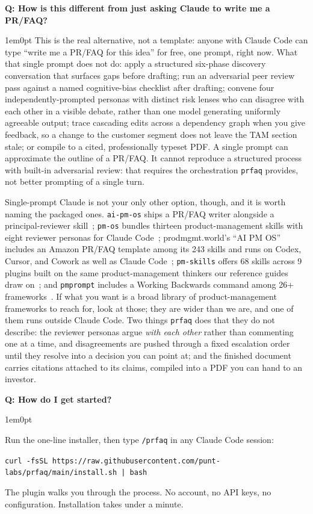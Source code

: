 \documentclass[11pt,letterpaper]{article}
\newcounter{faqnum}
\newenvironment{faqpair}[1]{%
  \needspace{4\baselineskip}%
  \vspace{0.5em}%
  \refstepcounter{faqnum}%
  \noindent\textbf{\color{SectionBlue}Q\thefaqnum: #1}\par\nopagebreak[4]%
  \vspace{0.2em}%
  \begin{adjustwidth}{1em}{0pt}%
  \setlength{\parindent}{0pt}%
}{%
  \end{adjustwidth}%
  \vspace{0.5em}%
}
\begin{document}
\begin{faqpair}{How is this different from just asking Claude to write me a PR/FAQ?}\label{faq:vs-single-prompt}
  This is the real alternative, not a template: anyone with Claude Code can type ``write me a PR/FAQ for this idea'' for free, one prompt, right now. What that single prompt does not do: apply a structured six-phase discovery conversation that surfaces gaps before drafting; run an adversarial peer review pass against a named cognitive-bias checklist after drafting; convene four independently-prompted personas with distinct risk lenses who can disagree with each other in a visible debate, rather than one model generating uniformly agreeable output; trace cascading edits across a dependency graph when you give feedback, so a change to the customer segment does not leave the TAM section stale; or compile to a cited, professionally typeset PDF. A single prompt can approximate the outline of a PR/FAQ. It cannot reproduce a structured process with built-in adversarial review: that requires the orchestration \texttt{prfaq} provides, not better prompting of a single turn.

  Single-prompt Claude is not your only other option, though, and it is worth naming the packaged ones. \texttt{ai-pm-os} ships a PR/FAQ writer alongside a principal-reviewer skill~\cite{aipmos2026}; \texttt{pm-os} bundles thirteen product-management skills with eight reviewer personas for Claude Code~\cite{sevanpro2026pmos}; prodmgmt.world's ``AI PM OS'' includes an Amazon PR/FAQ template among its 243 skills and runs on Codex, Cursor, and Cowork as well as Claude Code~\cite{prodmgmtworld2026aipmos}; \texttt{pm-skills} offers 68 skills across 9 plugins built on the same product-management thinkers our reference guides draw on~\cite{pmskills2026}; and \texttt{pmprompt} includes a Working Backwards command among 26+ frameworks~\cite{pmprompt2026}. If what you want is a broad library of product-management frameworks to reach for, look at those; they are wider than we are, and one of them runs outside Claude Code. Two things \texttt{prfaq} does that they do not describe: the reviewer personas argue \textit{with each other} rather than commenting one at a time, and disagreements are pushed through a fixed escalation order until they resolve into a decision you can point at; and the finished document carries citations attached to its claims, compiled into a PDF you can hand to an investor.
\end{faqpair}

\begin{faqpair}{How do I get started?}
  Run the one-line installer, then type \texttt{/prfaq} in any Claude Code session:

  \smallskip
  {\small\texttt{curl -fsSL https://raw.githubusercontent.com/punt-labs/prfaq/main/install.sh | bash}}
  \smallskip

  \noindent The plugin walks you through the process. No account, no API keys, no configuration. Installation takes under a minute.
\end{faqpair}
\end{document}
